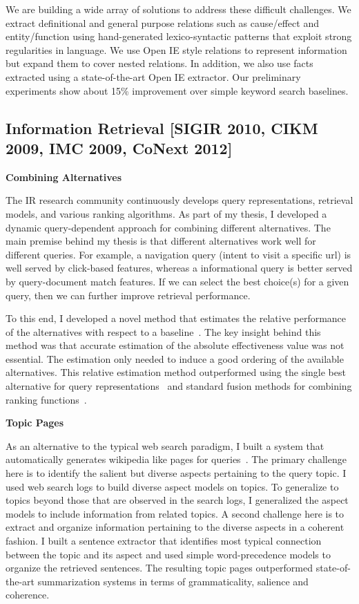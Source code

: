 \documentclass[a4paper,11pt,onecolumn]{article}
\begin{document}
We are building a wide array of solutions to address these difficult challenges. We extract definitional and general purpose relations such as cause/effect and entity/function using hand-generated lexico-syntactic patterns that exploit strong regularities in language. We use Open IE style relations to represent information but expand them to cover nested relations. In addition, we also use facts extracted using a state-of-the-art Open IE extractor. Our preliminary experiments show about 15\% improvement over simple keyword search baselines.

\subsection*{Information Retrieval [SIGIR 2010, CIKM 2009, IMC 2009, CoNext 2012]}

{\bf Combining Alternatives}

The IR research community continuously develops query representations, retrieval models, and various ranking algorithms. As part of my thesis, I developed a dynamic query-dependent approach for combining different alternatives. The main premise behind my thesis is that different alternatives work well for different queries. For example, a navigation query (intent to visit a specific url) is well served by click-based features, whereas a informational query is better served by query-document match features. If we can select the best choice(s) for a given query, then we can further improve retrieval performance. 

To this end, I developed a novel method that estimates the relative performance of the alternatives with respect to a baseline~\cite{balasubramanian-sigir10a}. The key insight behind this method was that accurate estimation of the absolute effectiveness value was not essential. The estimation only needed to induce a good ordering of the available alternatives. This relative estimation method outperformed using the single best alternative for query representations~\cite{balasubramanian-sigir10b} and standard fusion methods for combining ranking functions~\cite{balasubramanian-sigir10c}. 


{\bf Topic Pages}

As an alternative to the typical web search paradigm, I built a system that automatically generates wikipedia like pages for queries~\cite{balasubramanian-icsc2010}. The primary challenge here is to identify the salient but diverse aspects pertaining to the query topic. I used web search logs to build diverse aspect models on topics. To generalize to topics beyond those that are observed in the search logs, I generalized the aspect models to include information from related topics. A second challenge here is to extract and organize information pertaining to the diverse aspects in a coherent fashion. I built a sentence extractor that identifies most typical connection between the topic and its aspect and used simple word-precedence models to organize the retrieved sentences. The resulting topic pages outperformed state-of-the-art summarization systems in terms of grammaticality, salience and coherence.
\end{document}
